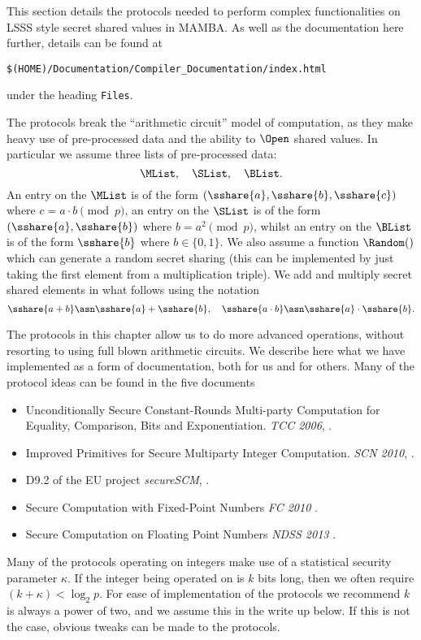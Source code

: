 This section details the protocols needed to perform complex
functionalities on LSSS style secret shared values in MAMBA.
As well as the documentation here further, details can be
found at 
\begin{center}
   \verb+$(HOME)/Documentation/Compiler_Documentation/index.html+
\end{center}
under the heading \verb+Files+.

The protocols break the ``arithmetic circuit'' model of computation,
as they make heavy use of pre-processed data and the ability
to $\Open$ shared values.
In particular we assume three lists of pre-processed data:
\[ \MList, \quad \SList, \quad \BList. \]
An entry on the $\MList$ is of the form 
$(\sshare{a}, \sshare{b}, \sshare{c})$ where $c=a \cdot b \pmod{p}$,
an entry on the $\SList$ is of the form
$(\sshare{a}, \sshare{b})$ where $b=a^2 \pmod{p}$,
whilst an entry on the $\BList$ is of the form
$\sshare{b}$ where $b \in \{0,1\}$.
We also assume a function $\Random()$ which can generate
a random secret sharing (this can be implemented by just taking
the first element from a multiplication triple).
We add and multiply secret shared elements in what follows
using the notation 
\[ \sshare{a+b} \asn \sshare{a}+\sshare{b}, \quad
   \sshare{a\cdot b} \asn \sshare{a} \cdot \sshare{b}.
\]

The protocols in this chapter allow us to do more advanced operations,
without resorting to using full blown arithmetic circuits.
We describe here what we have implemented as a form of
documentation, both for us and for others. 
Many of the protocol ideas can be found in the five
documents
\begin{itemize}
\item Unconditionally Secure Constant-Rounds
Multi-party Computation for Equality, Comparison, Bits and Exponentiation.
{\em TCC 2006}, \cite{DFKNT06}.
\item Improved Primitives for Secure Multiparty Integer Computation.
{\em SCN 2010}, \cite{CH10}.
\item D9.2 of the EU project {\em secureSCM}, \cite{SSCM}.
\item Secure Computation with Fixed-Point Numbers {\em FC 2010} \cite{CS10}.
\item Secure Computation on Floating Point Numbers {\em NDSS 2013} \cite{ABZS13}.
\end{itemize}
Many of the protocols operating on integers make use of a statistical security 
parameter $\kappa$.
If the integer being operated on is $k$ bits long, then we often require $(k+\kappa)<\log_2 p$.
For ease of implementation of the protocols we recommend $k$ is
always a power of two, and we assume this in the write up below.
If this is not the case, obvious tweaks can be made to the protocols.


